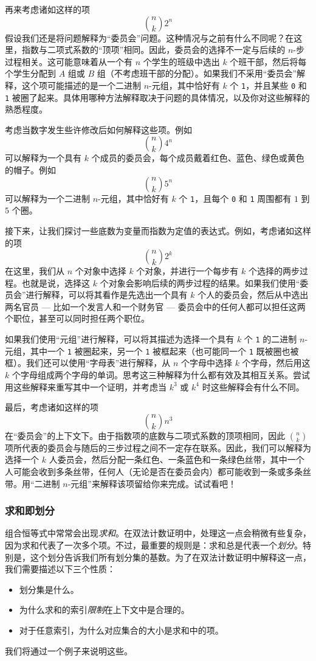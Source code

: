 再来考虑诸如这样的项
\[{n \choose k}2^n\]
假设我们还是将问题解释为``委员会''问题。这种情况与之前有什么不同呢？在这里，指数与二项式系数的``顶项''相同。因此，委员会的选择不一定与后续的 $n$-步过程相关。这可能意味着从一个有 $n$ 个学生的班级中选出 $k$ 个班干部，然后将每个学生分配到 $A$ 组或 $B$ 组（不考虑班干部的分配）。如果我们不采用``委员会''解释，这个项可能描述的是一个二进制 $n$-元组，其中恰好有 $k$ 个 \verb|1|，并且某些 \verb|0| 和 \verb|1| 被圈了起来。具体用哪种方法解释取决于问题的具体情况，以及你对这些解释的熟悉程度。

考虑当数字发生些许修改后如何解释这些项。例如
\[{n \choose k}4^n\]
可以解释为一个具有 $k$ 个成员的委员会，每个成员戴着红色、蓝色、绿色或黄色的帽子。例如
\[{n \choose k}5^n\]
可以解释为一个二进制 $n$-元组，其中恰好有 $k$ 个 \verb|1|，且每个 \verb|0| 和 \verb|1| 周围都有 $1$ 到 $5$ 个圈。

接下来，让我们探讨一些底数为变量而指数为定值的表达式。例如，考虑诸如这样的项
\[{n \choose k}2^k\]
在这里，我们从 $n$ 个对象中选择 $k$ 个对象，并进行一个每步有 $k$ 个选择的两步过程。也就是说，选择这 $k$ 个对象会影响后续的两步过程的结果。如果我们使用``委员会''进行解释，可以将其看作是先选出一个具有 $k$ 个人的委员会，然后从中选出两名官员 --- 比如一个发言人和一个财务官 --- 委员会中的任何人都可以担任这两个职位，甚至可以同时担任两个职位。

如果我们使用``元组''进行解释，可以将其描述为选择一个具有 $k$ 个 \verb|1| 的二进制 $n$-元组，其中一个 \verb|1| 被圈起来，另一个 \verb|1| 被框起来（也可能同一个 \verb|1| 既被圈也被框）。我们还可以使用``字母表''进行解释，从 $n$ 个字母中选择 $k$ 个字母，然后用这 $k$ 个字母组成两个字母的单词。思考这三种解释为什么都有效及其相互关系。尝试用这些解释来重写其中一个证明，并考虑当 $k^3$ 或 $k^4$ 时这些解释会有什么不同。

最后，考虑诸如这样的项
\[{n \choose k}n^3\]
在``委员会''的上下文下。由于指数项的底数与二项式系数的顶项相同，因此 ${n \choose k}$ 项所代表的委员会与随后的三步过程之间不一定存在联系。因此，我们可以解释为选择一个 $k$ 人委员会，然后分配一条红色、一条蓝色和一条绿色丝带，其中一个人可能会收到多条丝带，任何人（无论是否在委员会内）都可能收到一条或多条丝带。用``二进制 $n$-元组''来解释该项留给你来完成。试试看吧！

\subsubsection*{求和即划分}

组合恒等式中常常会出现\emph{求和}。在双法计数证明中，处理这一点会稍微有些复杂，因为求和代表了一次多个项。不过，最重要的规则是：求和总是代表一个\emph{划分}。特别是，这个划分告诉我们所有划分集的基数。为了在双法计数证明中解释这一点，我们需要描述以下三个性质：
\begin{itemize}
    \item 划分集是什么。
    \item 为什么求和的索引\emph{限制}在上下文中是合理的。
    \item 对于任意索引，为什么对应集合的大小是求和中的项。
\end{itemize}
我们将通过一个例子来说明这些。

